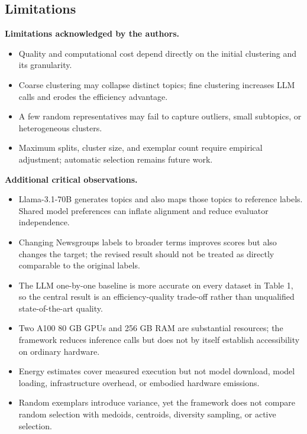\documentclass[11pt]{article}
\begin{document}
\subsection{Limitations}\label{limitations-2}

\textbf{Limitations acknowledged by the authors.}

\begin{itemize}
\item
  Quality and computational cost depend directly on the initial
  clustering and its granularity.
\item
  Coarse clustering may collapse distinct topics; fine clustering
  increases LLM calls and erodes the efficiency advantage.
\item
  A few random representatives may fail to capture outliers, small
  subtopics, or heterogeneous clusters.
\item
  Maximum splits, cluster size, and exemplar count require empirical
  adjustment; automatic selection remains future work.
\end{itemize}

\textbf{Additional critical observations.}

\begin{itemize}
\item
  Llama-3.1-70B generates topics and also maps those topics to reference
  labels. Shared model preferences can inflate alignment and reduce
  evaluator independence.
\item
  Changing Newsgroups labels to broader terms improves scores but also
  changes the target; the revised result should not be treated as
  directly comparable to the original labels.
\item
  The LLM one-by-one baseline is more accurate on every dataset in Table
  1, so the central result is an efficiency-quality trade-off rather
  than unqualified state-of-the-art quality.
\item
  Two A100 80 GB GPUs and 256 GB RAM are substantial resources; the
  framework reduces inference calls but does not by itself establish
  accessibility on ordinary hardware.
\item
  Energy estimates cover measured execution but not model download,
  model loading, infrastructure overhead, or embodied hardware
  emissions.
\item
  Random exemplars introduce variance, yet the framework does not
  compare random selection with medoids, centroids, diversity sampling,
  or active selection.
\end{itemize}
\end{document}
